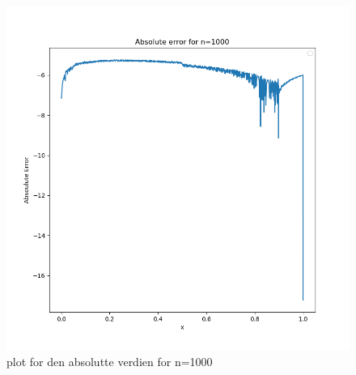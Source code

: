 \documentclass[english,notitlepage]{revtex4-1}  %
\begin{document}
\begin{figure}
	\centering
	\includegraphics[scale=0.5]{Images/abserrn1000.png}
	\caption{plot for den absolutte verdien for n=1000}
	\label{abserrn1000}
\end{figure}
\end{document}
